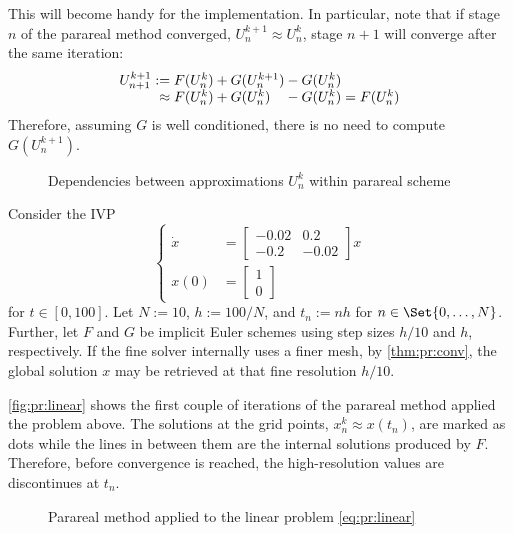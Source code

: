 This will become handy for the implementation.
In particular, note that if stage $n$ of the parareal method converged,
\ie $U^{k+1}_n \approx U^k_n$,
stage $n+1$ will converge after the same iteration:
\begin{equation*}
  \begin{array}{r@{}l@{}l@{}l}
    U^{k+1}_{n+1}
    :={}      & F(U^k_n) &{}+ G(U^{k+1}_n) &{}- G(U^k_n) \\
    \approx{} & F(U^k_n) &{}+ G(U^k_n)     &{}- G(U^k_n)
    = F(U^k_n)
  \end{array}
\end{equation*}
Therefore,
assuming $G$ is well conditioned,
there is no need to compute $G(U^{k+1}_n)$.

\begin{figure}[htb]
  \caption{Dependencies between approximations $U^k_n$ within parareal scheme}
\end{figure}

\begin{example}
  Consider the \ac{IVP}
  \begin{equation}
    \label{eq:pr:linear}
    \left\{
    \begin{aligned}
      \dot x &= \begin{bmatrix}
        -0.02 & 0.2 \\
        -0.2  & -0.02
      \end{bmatrix} x \\
      x(0) &= \begin{bmatrix}
        1 \\ 0
      \end{bmatrix}
    \end{aligned}
    \right.
  \end{equation}
  for $t\in[0,100]$.
  Let $N := 10$, $h := 100/N$, and $t_n := nh$ for $n\in\Set{0,\ldots,N}$.
  Further, let $F$ and $G$ be implicit Euler schemes using step sizes $h/10$ and $h$, respectively.
  If the fine solver internally uses a finer mesh,
  by \autoref{thm:pr:conv},
  the global solution $x$ may be retrieved at that fine resolution $h/10$.

  \autoref{fig:pr:linear} shows the first couple of iterations of the parareal method applied the problem above.
  The solutions at the grid points, $x^k_n \approx x(t_n)$, are marked as dots
  while the lines in between them are the internal solutions produced by $F$.
  Therefore, before convergence is reached,
  the high-resolution values are discontinues at $t_n$.
  \begin{figure}[htb]
    \caption{Parareal method applied to the linear problem \eqref{eq:pr:linear}}
    \label{fig:pr:linear}
  \end{figure}
\end{example}

